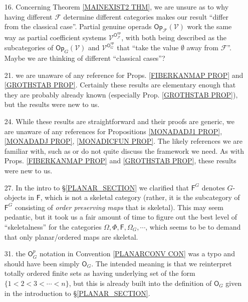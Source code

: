 \documentclass{article}
\begin{document}
\begin{itemize}
	\item[16.] Concerning Theorem \ref{MAINEXIST2 THM},
	we are unsure as to why 
	having different $\mathcal{F}$ determine
	different categories makes our result
	``differ from the classical case''. 
	Partial genuine operads $\mathsf{Op}_{\mathcal{F}}(\mathcal{V})$
	work the same way as partial coefficient
	systems $\mathcal{V}^{\mathsf{O}_{\mathcal{F}}^{op}}$,
	with both being described as the subcategories
	of $\mathsf{Op}_{G}(\mathcal{V})$ and
	$\mathcal{V}^{\mathsf{O}_{G}^{op}}$
	that ``take the value $\emptyset$ away from $\mathcal{F}$''.
	Maybe we are thinking of different ``classical cases''? 
	
	\item[21.] we are unaware of any reference for Props. 
	\ref{FIBERKANMAP PROP} and \ref{GROTHSTAB PROP}.
	Certainly these results are elementary enough that they are probably already known (especially Prop. \ref{GROTHSTAB PROP}),
	but the results were new to us. 
	
	\item[24.] While these results are straightforward 
	and their proofs are generic, 
	we are unaware of any references for Propositions \ref{MONADADJ1 PROP}, \ref{MONADADJ PROP}, \ref{MONADICFUN PROP}. The likely references we are familiar with, such as 
	\cite{Bo94} or \cite{Ri17} do not quite discuss the framework we need.
	As with Props. 
	\ref{FIBERKANMAP PROP} and \ref{GROTHSTAB PROP},
	these results were new to us.
	
	\item[27.] In the intro to \S \ref{PLANAR_SECTION} we
	clarified that $\mathsf{F}^G$ denotes $G$-objects in $\mathsf{F}$,
	which is not a skeletal category (rather, it is the subcategory of $\mathsf{F}^G$ consisting of \emph{order preserving maps} that is skeletal).
	This may seem pedantic,
	but it took us a fair amount of time to figure out the best level of ``skeletalness'' for the categories 
	$\Omega, \Phi, \mathsf{F}, \Omega_G, \cdots$, 
	which seems to be to demand that only planar/ordered maps are skeletal.
	
	\item[31.] the $\mathsf{O}^p_G$ notation in 
	Convention \ref{PLANARCONV CON}
	was a typo and should have been simply $\mathsf{O}_G$.
	The intended meaning is that we reinterpret totally ordered finite sets as having underlying set of the form
	$\{1<2<3<\cdots <n\}$,
	but this is already built into the definition of 
	$\mathsf{O}_G$ given in the introduction to
	\S \ref{PLANAR_SECTION}.


\end{itemize}
\end{document}
